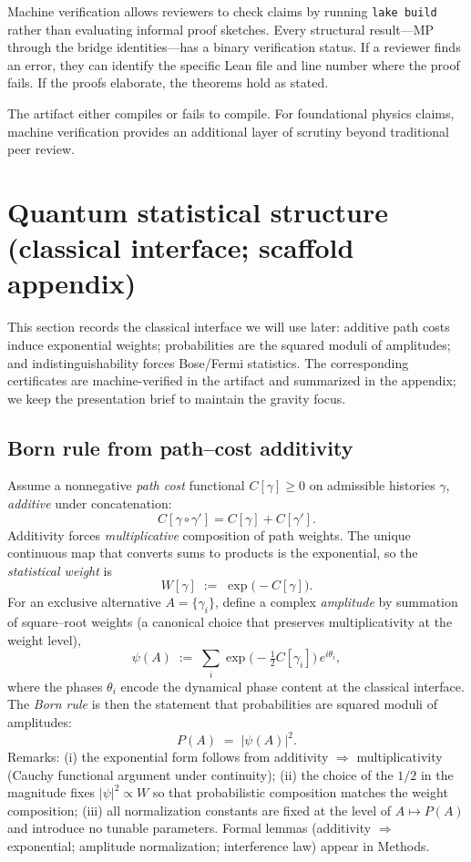 \documentclass[11pt]{article}
\begin{document}
Machine verification allows reviewers to check claims by running \texttt{lake build} rather than evaluating informal proof sketches. Every structural result—MP through the bridge identities—has a binary verification status. If a reviewer finds an error, they can identify the specific Lean file and line number where the proof fails. If the proofs elaborate, the theorems hold as stated.

The artifact either compiles or fails to compile. For foundational physics claims, machine verification provides an additional layer of scrutiny beyond traditional peer review.

\section{Quantum statistical structure (classical interface; scaffold appendix)}
\label{sec:quantum-structure}

This section records the classical interface we will use later: additive path costs induce exponential weights; probabilities are the squared moduli of amplitudes; and indistinguishability forces Bose/Fermi statistics. The corresponding certificates are machine-verified in the artifact and summarized in the appendix; we keep the presentation brief to maintain the gravity focus.

\subsection{Born rule from path--cost additivity}
\label{subsec:born-additivity}

Assume a nonnegative \emph{path cost} functional $C[\gamma]\ge 0$ on admissible histories $\gamma$, \emph{additive} under concatenation:
\[
C[\gamma\circ\gamma']=C[\gamma]+C[\gamma'].
\]
Additivity forces \emph{multiplicative} composition of path weights. The unique continuous map that converts sums to products is the exponential, so the \emph{statistical weight} is
\[
W[\gamma]\;:=\;\exp\!\big(-C[\gamma]\big).
\]
For an exclusive alternative $A=\{\gamma_i\}$, define a complex \emph{amplitude} by summation of square–root weights (a canonical choice that preserves multiplicativity at the weight level),
\[
\psi(A)\;:=\;\sum_i \exp\!\Big(-\tfrac{1}{2}C[\gamma_i]\Big)\,e^{i\theta_i},
\]
where the phases $\theta_i$ encode the dynamical phase content at the classical interface. The \emph{Born rule} is then the statement that probabilities are squared moduli of amplitudes:
\[
P(A)\;=\;|\psi(A)|^2.
\]
Remarks: (i) the exponential form follows from additivity $\Rightarrow$ multiplicativity (Cauchy functional argument under continuity); (ii) the choice of the $1/2$ in the magnitude fixes $|\psi|^2\propto W$ so that probabilistic composition matches the weight composition; (iii) all normalization constants are fixed at the level of $A\mapsto P(A)$ and introduce no tunable parameters. Formal lemmas (additivity $\Rightarrow$ exponential; amplitude normalization; interference law) appear in Methods.
\end{document}

